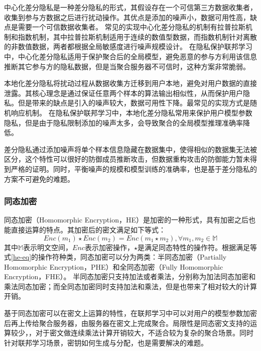 中心化差分隐私是一种差分隐私的形式，其假设存在一个可信第三方数据收集者，收集到参与方数据之后进行扰动操作。其优点是添加的噪声小，数据可用性高，缺点是需要一个可信数据收集者。
常见的实现中心化差分隐私的机制有拉普拉斯机制\cite{dwork2006calibrating}和指数机制\cite{mcsherry2007mechanism}，其中拉普拉斯机制适用于连续的数值型数据，而指数机制针对离散的非数值数据，两者都根据全局敏感度进行噪声规模设计。
在隐私保护联邦学习中，中心化差分隐私适用于保护聚合后的全局模型，避免恶意的参与方利用该信息推断其它参与方的隐私数据，但是当聚合服务器不可信时，这种方案非常脆弱。

本地化差分隐私将扰动过程从数据收集方迁移到用户本地，避免对用户数据的直接泄露。其核心理念是通过保证任意两个样本的算法输出相似性，从而保护用户隐私。但是带来的缺点是引入的噪声较大，数据可用性下降。最常见的实现方式是随机响应机制\cite{20181981}。
在隐私保护联邦学习中，本地化差分隐私常用来保护用户模型参数隐私，但是由于隐私限制添加的噪声太多，会导致聚合的全局模型推理准确率降低。

差分隐私通过添加噪声将单个样本信息隐藏在数据集中，使得相似的数据集无法被区分，这个特性可以很好的防御成员推断攻击，但数据重构攻击的防御能力暂未得到严格的证明。同时，平衡噪声的规模和模型训练的准确率，也是基于差分隐私的方案不可避免的难题。
%	

\subsubsection{同态加密}
同态加密（Homomorphic Encryption，HE）\cite{rivest1978data}是加密的一种形式，具有加密之后也能直接运算的特点。其加密后的密文满足如下等式：
\begin{equation}\label{he-eq}
	Enc(m_1)\star Enc(m_2) = Enc(m_1\star m_2), \forall m_1,m_2 \in \mathbb{M}
\end{equation}
其中$ \mathbb{M} $表示明文空间，$Enc$表示加密操作，$\star$是满足同态特性的操作符。根据满足等式\ref{he-eq}的操作符种类，同态加密可以分为两类：半同态加密（Partially Homomorphic Encryption，PHE）\cite{paillier1999public}和全同态加密（Fully Homomorphic Encryption，FHE）\cite{van2010fully}。
半同态加密只支持加法或者乘法，分别称为加法同态加密\cite{kawachi2007multi}和乘法同态加密\cite{elgamal1985public}；而全同态加密同时支持加法和乘法，但是也带来了相对较大的计算开销。

基于同态加密可以在密文上运算的特性，在联邦学习中可以对用户的模型参数加密后再上传给聚合服务器，由服务器在密文上完成聚合。局限性是同态密文支持的运算较少，，对于密文做连续乘法计算开销较大，不适合较为复杂的聚合场景。同时针对联邦学习场景，密钥如何生成与分配，也是需要解决的难题。

